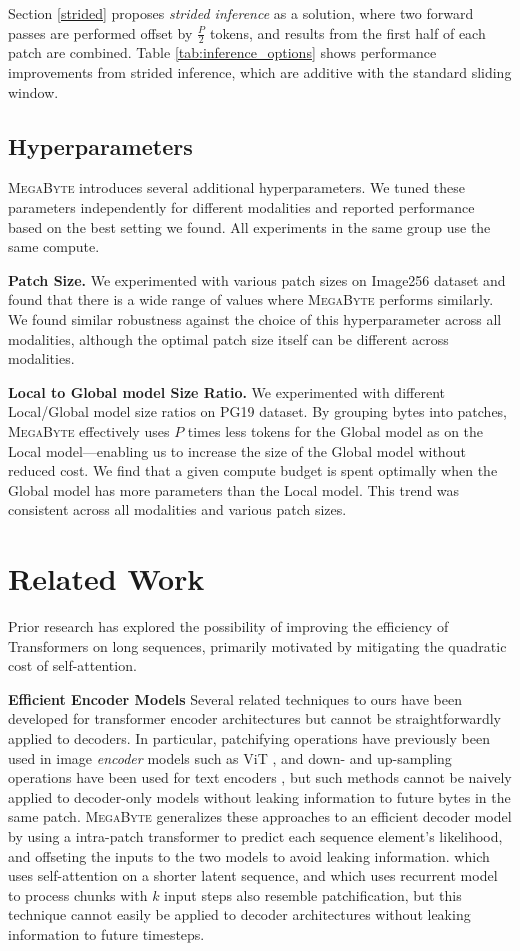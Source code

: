  Section \ref{strided} proposes \emph{strided inference} as a solution, where two forward passes are performed offset by $\frac{P}{2}$ tokens, and results from the first half of each patch are combined. Table \ref{tab:inference_options} shows performance improvements from strided inference, which are additive with the standard sliding window.

\subsection{Hyperparameters}

\textsc{MegaByte} introduces several additional hyperparameters. We tuned these parameters independently for different modalities and reported performance based on the best setting we found. All experiments in the same group use the same compute. 

\textbf{Patch Size.} We experimented with various patch sizes on Image256 dataset and found that there is a wide range of values where \textsc{MegaByte} performs similarly. We found similar robustness against the choice of this hyperparameter across all modalities, although the optimal patch size itself can be different across modalities.

\textbf{Local to Global model Size Ratio.} We experimented with different Local/Global model size ratios on PG19 dataset. By grouping bytes into patches, \textsc{MegaByte} effectively uses $P$ times less tokens for the Global model as on the Local model---enabling us to increase the size of the Global model without reduced cost. We find that a given compute budget is spent optimally when the Global model has more parameters than the Local model. This trend was consistent across all modalities and various patch sizes.

\section{Related Work}
\label{sec:related}
Prior research has explored the possibility of improving the efficiency of Transformers on long sequences, primarily motivated by mitigating the quadratic cost of self-attention.

\textbf{Efficient Encoder Models} Several related techniques to ours have been developed for transformer encoder architectures but cannot be straightforwardly applied to decoders. In particular, patchifying operations have previously been used in image \emph{encoder} models such as ViT \citep{vit}, and down- and up-sampling operations have been used for text encoders \citep{canine}, but such methods cannot be naively applied to decoder-only models without leaking information to future bytes in the same patch. \textsc{MegaByte} generalizes these approaches to an efficient decoder model by using a intra-patch transformer to predict each sequence element's likelihood, and offseting the inputs to the two models to avoid leaking information. \citet{perceiver} which uses self-attention on a shorter latent sequence, and \citet{temporalbottleneck} which uses recurrent model to process chunks with $k$ input steps also resemble patchification, but this technique cannot easily be applied to decoder architectures without leaking information to future timesteps.

